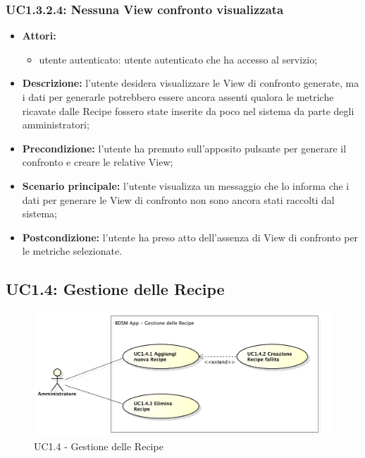 \subsubsection{UC1.3.2.4: Nessuna View confronto visualizzata}
\begin{itemize}
	\item \textbf{Attori:}
	\begin{itemize}
		\item utente autenticato: utente autenticato che ha accesso al servizio;
	\end{itemize}
	\item \textbf{Descrizione:} l'utente desidera visualizzare le View di confronto generate, ma i dati per generarle potrebbero essere ancora assenti qualora le metriche ricavate dalle Recipe fossero state inserite da poco nel sistema da parte degli amministratori;
	\item \textbf{Precondizione:} l'utente ha premuto sull'apposito pulsante per generare il confronto e creare le relative View;
	\item \textbf{Scenario principale:} l'utente visualizza un messaggio che lo informa che i dati per generare le View di confronto non sono ancora stati raccolti dal sistema;
	\item \textbf{Postcondizione:} l'utente ha preso atto dell'assenza di View di confronto per le metriche selezionate.
\end{itemize}

\pagebreak


\subsection{UC1.4: Gestione delle Recipe}
\begin{figure}[!ht]
	\centering
	\centerline{\includegraphics[scale=0.45]{./images/UC1_4.pdf}}
	\caption{UC1.4 - Gestione delle Recipe}
\end{figure}

